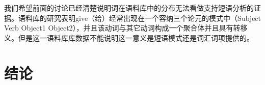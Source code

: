 \begin{exe}
\begin{xlist}[iv.]
\begin{exe}
\begin{xlist}[iv.]

\noindent
我们希望前面的讨论已经清楚说明词在语料库中的分布无法看做支持短语分析的证据。语料库的研究表明give（给）经常出现在一个容纳三个论元的模式中（Subject Verb Object1 Object2），并且该动词与其它动词构成一个聚合体并且具有转移义。但是这一语料库库数据不能说明这一意义是短语模式还是词汇词项提供的。

\section{结论}

%


\end{xlist}
\end{exe}
\end{xlist}
\end{exe}
